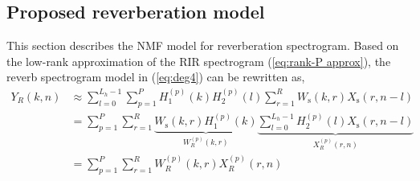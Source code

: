 \subsection{Proposed reverberation model}
This section describes the NMF model for reverberation spectrogram. Based on the low-rank approximation of the RIR spectrogram (\ref{eq:rank-P approx}), the reverb spectrogram model in (\ref{eq:deg4}) can be rewritten as,
\begin{align}
Y_R(k,n) &\approx \sum_{l=0}^{L_h-1}\sum_{p=1}^P H_1^{(p)}(k)H_2^{(p)}(l)\sum_{r=1}^R W_{\text{s}}(k,r)X_{\text{s}}(r,n-l) \nonumber \\ 
         &=\sum_{p=1}^P \sum_{r=1}^R \underbrace{W_{\text{s}}(k,r)H_1^{(p)}(k)}_\textrm{$W_R^{(p)}(k,r)$} \underbrace{ \sum_{l=0}^{L_h-1}H_2^{(p)}(l)X_{\text{s}}(r,n-l) }_\textrm{$X_R^{(p)}(r,n)$} \nonumber \\
         &= \sum_{p=1}^P \sum_{r=1}^R W_R^{(p)}(k,r)X_R^{(p)}(r,n)
\label{eq:Proposed_reverb_model}
\end{align}

